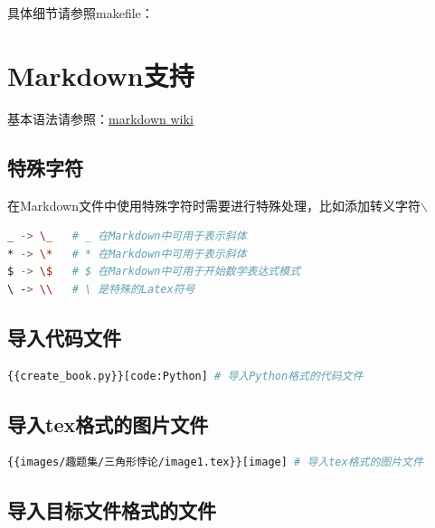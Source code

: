 \documentclass[export, 12pt, letterpaper]{ctexrep}
\begin{document}
具体细节请参照makefile：



\chapter{Markdown支持}

基本语法请参照：\href{https://simplemde.com/markdown-guide}{markdown wiki}

\section{特殊字符}

在Markdown文件中使用特殊字符时需要进行特殊处理，比如添加转义字符$\backslash$
\begin{lstlisting}[language=Bash]
_ -> \_   # _ 在Markdown中可用于表示斜体
* -> \*   # * 在Markdown中可用于表示斜体
$ -> \$   # $ 在Markdown中可用于开始数学表达式模式
\ -> \\   # \ 是特殊的Latex符号
\end{lstlisting}

\section{导入代码文件}

\begin{lstlisting}[language=Bash]
{{create_book.py}}[code:Python] # 导入Python格式的代码文件
\end{lstlisting}



\section{导入tex格式的图片文件}

\begin{lstlisting}[language=Bash]
{{images/趣题集/三角形悖论/image1.tex}}[image] # 导入tex格式的图片文件
\end{lstlisting}

\begin{center}

\end{center}

\section{导入目标文件格式的文件}
\end{document}
